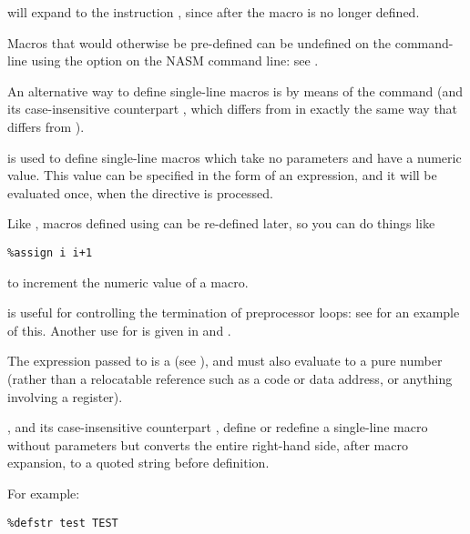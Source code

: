 will expand to the instruction , since after
 the macro  is no longer defined.

Macros that would otherwise be pre-defined can be undefined on the
command-line using the  option on the NASM command line:
see .


An alternative way to define single-line macros is by means of the
 command (and its case-insensitive
counterpart , which differs from  in
exactly the same way that  differs from ).

 is used to define single-line macros which take no
parameters and have a numeric value. This value can be specified in
the form of an expression, and it will be evaluated once, when the
 directive is processed.

Like , macros defined using  can be
re-defined later, so you can do things like

\begin{lstlisting}
%assign i i+1
\end{lstlisting}

to increment the numeric value of a macro.

 is useful for controlling the termination of 
preprocessor loops: see  for an example of this. Another
use for  is given in  and .

The expression passed to  is a 
(see ), and must also evaluate to a pure number
(rather than a relocatable reference such as a code or data address,
or anything involving a register).


, and its case-insensitive counterpart ,
define or redefine a single-line macro without parameters but converts
the entire right-hand side, after macro expansion, to a quoted string
before definition.

For example:

\begin{lstlisting}
%defstr test TEST
\end{lstlisting}

